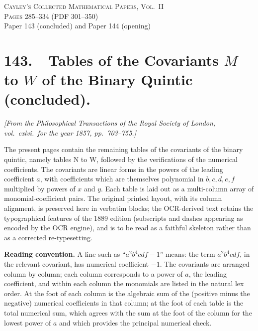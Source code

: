 \documentclass[11pt]{article}
\begin{document}
\begin{center}
\textsc{Cayley's Collected Mathematical Papers, Vol.~II}\\[2pt]
\textsc{Pages 285--334 (PDF 301--350)}\\[2pt]
\small Paper 143 (concluded) and Paper 144 (opening)
\end{center}

\bigskip

\section*{143.\ \ Tables of the Covariants $M$ to $W$ of the Binary Quintic (concluded).}

\noindent\textit{[From the Philosophical Transactions of the Royal Society of London, vol.\ cxlvi.\ for the year 1857, pp.\ 703--755.]}

\medskip

\noindent The present pages contain the remaining tables of the covariants of the binary quintic, namely tables N to W, followed by the verifications of the numerical coefficients. The covariants are linear forms in the powers of the leading coefficient $a$, with coefficients which are themselves polynomial in $b,c,d,e,f$ multiplied by powers of $x$ and $y$. Each table is laid out as a multi-column array of monomial-coefficient pairs. The original printed layout, with its column alignment, is preserved here in verbatim blocks; the OCR-derived text retains the typographical features of the 1889 edition (subscripts and dashes appearing as encoded by the OCR engine), and is to be read as a faithful skeleton rather than as a corrected re-typesetting.

\medskip

\noindent\textbf{Reading convention.} A line such as ``$a^2 b^4 cdf - 1$'' means: the term $a^2 b^4 c d f$, in the relevant covariant, has numerical coefficient $-1$. The covariants are arranged column by column; each column corresponds to a power of $a$, the leading coefficient, and within each column the monomials are listed in the natural lex order. At the foot of each column is the algebraic sum of the (positive minus the negative) numerical coefficients in that column; at the foot of each table is the total numerical sum, which agrees with the sum at the foot of the column for the lowest power of $a$ and which provides the principal numerical check.

\bigskip
\end{document}
